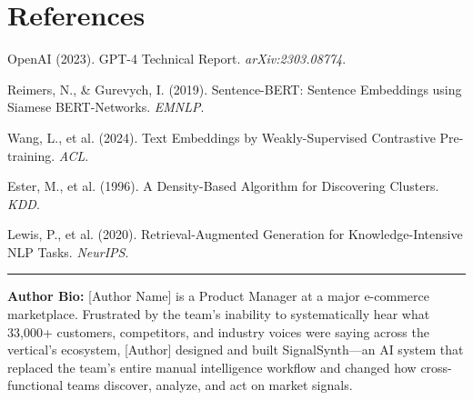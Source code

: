 \documentclass[11pt]{article}
\begin{document}
\section*{References}
\begin{enumerate}[nosep, label={[\arabic*]}]
    \item OpenAI (2023). GPT-4 Technical Report. \textit{arXiv:2303.08774}.
    \item Reimers, N., \& Gurevych, I. (2019). Sentence-BERT: Sentence Embeddings using Siamese BERT-Networks. \textit{EMNLP}.
    \item Wang, L., et al. (2024). Text Embeddings by Weakly-Supervised Contrastive Pre-training. \textit{ACL}.
    \item Ester, M., et al. (1996). A Density-Based Algorithm for Discovering Clusters. \textit{KDD}.
    \item Lewis, P., et al. (2020). Retrieval-Augmented Generation for Knowledge-Intensive NLP Tasks. \textit{NeurIPS}.
\end{enumerate}

\vfill
\noindent\rule{\linewidth}{0.4pt}
\small
\textbf{Author Bio:} [Author Name] is a Product Manager at a major e-commerce marketplace. Frustrated by the team's inability to systematically hear what 33,000+ customers, competitors, and industry voices were saying across the vertical's ecosystem, [Author] designed and built SignalSynth---an AI system that replaced the team's entire manual intelligence workflow and changed how cross-functional teams discover, analyze, and act on market signals.
\end{document}
